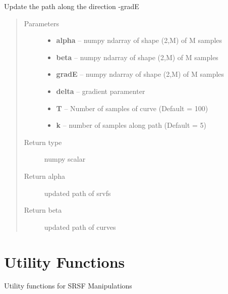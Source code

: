 \documentclass[letterpaper,10pt,english]{sphinxmanual}
\begin{document}
\begin{fulllineitems}
\label{geodesic:geodesic.update_path}
Update the path along the direction -gradE
\begin{quote}\begin{description}
\item[{Parameters}] \leavevmode\begin{itemize}
\item {} 
\textbf{alpha} -- numpy ndarray of shape (2,M) of M samples

\item {} 
\textbf{beta} -- numpy ndarray of shape (2,M) of M samples

\item {} 
\textbf{gradE} -- numpy ndarray of shape (2,M) of M samples

\item {} 
\textbf{delta} -- gradient paramenter

\item {} 
\textbf{T} -- Number of samples of curve (Default = 100)

\item {} 
\textbf{k} -- number of samples along path (Default = 5)

\end{itemize}

\item[{Return type}] \leavevmode
numpy scalar

\item[{Return alpha}] \leavevmode
updated path of srvfs

\item[{Return beta}] \leavevmode
updated path of curves

\end{description}\end{quote}

\end{fulllineitems}



\chapter{Utility Functions}
\label{utility_functions:utility-functions}\label{utility_functions:module-utility_functions}\label{utility_functions::doc}
Utility functions for SRSF Manipulations
\end{document}
